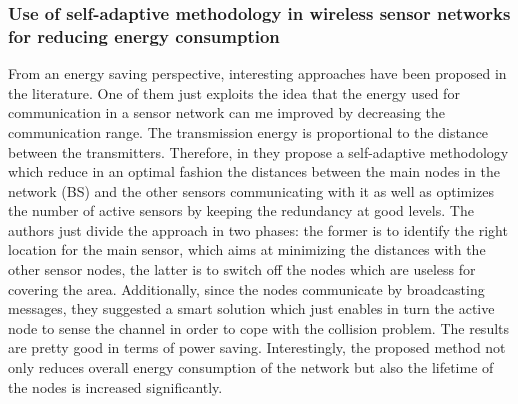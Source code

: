 \subsubsection*{Use of self-adaptive methodology in wireless sensor networks for
reducing energy consumption}
From an energy saving perspective, interesting approaches have been proposed in
the literature. One of them just exploits the idea that the energy used for
communication in a sensor network can me improved by decreasing the
communication range. The transmission energy is proportional to the distance
between the transmitters. Therefore, in \cite{reduceEnergy} they propose a
self-adaptive methodology which reduce in an optimal fashion the distances
between the main nodes in the network (BS) and the other sensors communicating
with it as well as optimizes the number of active sensors by keeping the
redundancy at good levels.  The authors just divide the approach in two phases:
the former is to identify the right location for the main sensor, which aims at
minimizing the distances with the other sensor nodes, the latter is to switch
off the nodes which are useless for covering the area. Additionally, since the
nodes communicate by broadcasting messages, they suggested a smart solution
which just enables in turn the active node to sense the channel in order to cope
with the collision problem. The results are pretty good in terms of power
saving. Interestingly, the proposed method not only reduces overall energy
consumption of the network but also the lifetime of the nodes is increased
significantly.
